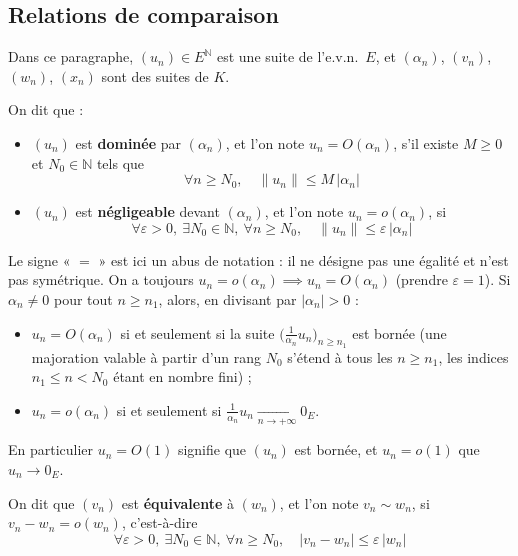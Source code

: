 \subsection{Relations de comparaison}
\label{subsec:relations-comparaison}

Dans ce paragraphe, $(u_n)\in E^{\mathbb{N}}$ est une suite de l'e.v.n.\ $E$, et $(\alpha_n)$, $(v_n)$, $(w_n)$, $(x_n)$ sont des suites de $K$.

\begin{defi}
\label{defi:domination}
On dit que :
\begin{itemize}
\item $(u_n)$ est \textbf{dominée} par $(\alpha_n)$, et l'on note $u_n=O(\alpha_n)$, s'il existe $M\geq 0$ et $N_0\in\mathbb{N}$ tels que
\[\forall n\geq N_0,\quad \|u_n\|\leq M\,|\alpha_n|\]
\item $(u_n)$ est \textbf{négligeable} devant $(\alpha_n)$, et l'on note $u_n=o(\alpha_n)$, si
\[\forall\varepsilon>0,\ \exists N_0\in\mathbb{N},\ \forall n\geq N_0,\quad \|u_n\|\leq\varepsilon\,|\alpha_n|\]
\end{itemize}
\end{defi}

\begin{remarque}
Le signe « $=$ » est ici un abus de notation : il ne désigne pas une égalité et n'est pas symétrique. On a toujours $u_n=o(\alpha_n)\implies u_n=O(\alpha_n)$ (prendre $\varepsilon=1$). Si $\alpha_n\neq 0$ pour tout $n\geq n_1$, alors, en divisant par $|\alpha_n|>0$ :
\begin{itemize}
\item $u_n=O(\alpha_n)$ si et seulement si la suite $\big(\frac{1}{\alpha_n}u_n\big)_{n\geq n_1}$ est bornée (une majoration valable à partir d'un rang $N_0$ s'étend à tous les $n\geq n_1$, les indices $n_1\leq n<N_0$ étant en nombre fini) ;
\item $u_n=o(\alpha_n)$ si et seulement si $\frac{1}{\alpha_n}u_n\xrightarrow[n\to+\infty]{}0_E$.
\end{itemize}
En particulier $u_n=O(1)$ signifie que $(u_n)$ est bornée, et $u_n=o(1)$ que $u_n\to 0_E$.
\end{remarque}

\begin{defi}
\label{defi:suites-equivalentes}
On dit que $(v_n)$ est \textbf{équivalente} à $(w_n)$, et l'on note $v_n\sim w_n$, si $v_n-w_n=o(w_n)$, c'est-à-dire
\[\forall\varepsilon>0,\ \exists N_0\in\mathbb{N},\ \forall n\geq N_0,\quad |v_n-w_n|\leq\varepsilon\,|w_n|\]
\end{defi}

